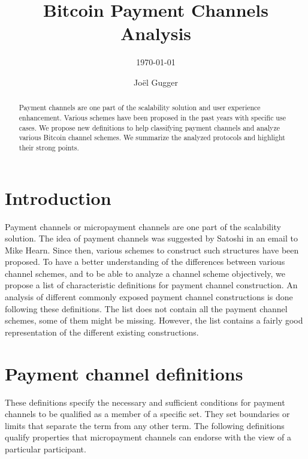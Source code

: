 \documentclass{llncs}
\begin{document}
\title{Bitcoin Payment Channels Analysis}
\author{Jo\"el Gugger}


\subtitle{{\normalsize\today}}


\maketitle

\begin{abstract} Payment channels are one part of the scalability solution and user experience enhancement. Various schemes have been proposed in the past years with specific use cases. We propose new definitions to help classifying payment channels and analyze various Bitcoin channel schemes. We summarize the analyzed protocols and highlight their strong points.
\end{abstract}

\section{Introduction}
Payment channels or micropayment channels are one part of the scalability solution. The idea of payment channels was suggested by Satoshi in an email to Mike Hearn. Since then, various schemes to construct such structures have been proposed. To have a better understanding of the differences between various channel schemes, and to be able to analyze a channel scheme objectively, we propose a list of characteristic definitions for payment channel construction. An analysis of different commonly exposed payment channel constructions is done following these definitions. The list does not contain all the payment channel schemes, some of them might be missing. However, the list contains a fairly good representation of the different existing constructions.

\section{Payment channel definitions}
These definitions specify the necessary and sufficient conditions for payment channels to be qualified as a member of a specific set. They set boundaries or limits that separate the term from any other term. The following definitions qualify properties that micropayment channels can endorse with the view of a particular participant.
\end{document}
